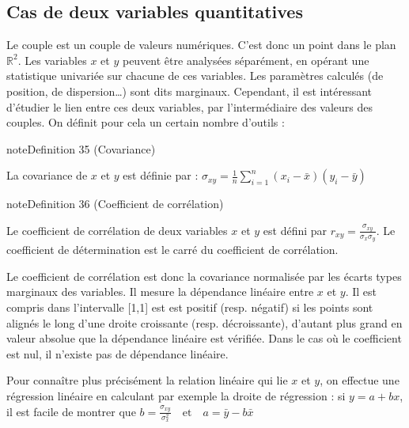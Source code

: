 \documentclass[letterpaper,10pt,french]{sphinxmanual}
\begin{document}
\subsection{Cas de deux variables quantitatives}
\label{\detokenize{statsdescriptives:cas-de-deux-variables-quantitatives}}
\sphinxAtStartPar
Le couple est un couple de valeurs numériques. C’est donc un point dans le plan \(\mathbb{R}^2\). Les variables \(x\) et \(y\) peuvent être analysées séparément, en opérant une statistique univariée sur chacune de ces variables. Les paramètres calculés (de position, de dispersion…) sont dits marginaux. Cependant, il est intéressant d’étudier le lien entre ces deux variables, par l’intermédiaire des valeurs des couples. On définit pour cela un certain nombre d’outils :
\label{statsdescriptives:definition-19}
\begin{sphinxadmonition}{note}{Definition 35 (Covariance)}



\sphinxAtStartPar
La covariance de \(x\) et \(y\) est définie par :
\(\sigma_{xy}=\frac{1}{n}\displaystyle\sum_{i=1}^n\left (x_i-\bar{x}\right )\left (y_i-\bar{y}\right )\)
\end{sphinxadmonition}

\ignorespaces 
{}\ignorespaces \label{statsdescriptives:definition-20}
\begin{sphinxadmonition}{note}{Definition 36 (Coefficient de corrélation)}



\sphinxAtStartPar
Le coefficient de corrélation  de deux variables \(x\) et \(y\) est défini par
\(r_{xy}=\frac{\sigma_{xy}}{\sigma_{x}\sigma_{y}}\).
Le coefficient de détermination est le carré du coefficient de corrélation.
\end{sphinxadmonition}

\sphinxAtStartPar
Le coefficient de corrélation est donc la covariance normalisée par les écarts types marginaux des variables. Il mesure la dépendance linéaire entre \(x\) et \(y\). Il est compris dans l’intervalle {[}\sphinxhyphen{}1,1{]} est est positif (resp. négatif) si les points sont alignés le long d’une droite croissante (resp. décroissante), d’autant plus grand en valeur absolue que la dépendance linéaire est vérifiée. Dans le cas où le coefficient est nul, il n’existe pas de dépendance linéaire.

\sphinxAtStartPar
Pour connaître plus précisément la relation linéaire qui lie \(x\) et \(y\), on effectue une régression linéaire en calculant par exemple la droite de régression : si \(y=a+bx\), il est facile de montrer que
\(b=\frac{\sigma_{xy}}{\sigma_x^2}\quad\textrm{et}\quad a=\bar{y}-b\bar{x}\)
\end{document}
